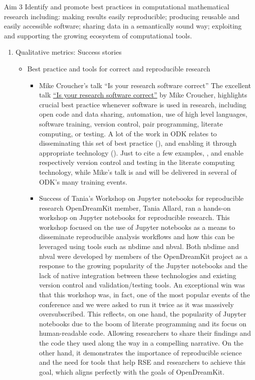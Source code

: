 \begin{recommendation}{Aim 3}
  Identify and promote best practices in computational mathematical research including: making results easily reproducible; producing
  reusable and easily accessible software; sharing data in a semantically sound way; exploiting and supporting the growing
  ecosystem of computational tools.
\end{recommendation}

\begin{enumerate}
\item Qualitative metrics: Success stories
\begin{itemize}
\item Best practice and tools for correct and reproducible research
 \begin{itemize}       
\item Mike Croucher's talk ``Is your research software correct''
 The excellent talk \href{https://mikecroucher.github.io/MLPM_talk/}{``Is your research software correct''} by Mike 
 Croucher, highlights crucial best practice whenever software is used in research, including open code and data sharing, 
 automation, use of high level languages, software training, version control, pair programming, literate computing, or testing. A 
 lot of the work in ODK relates to disseminating this set of best practice (), and enabling it through appropriate 
 technology ().  Just to cite a few examples, , and  
 enable respectively version control and testing in the \Jupyter literate computing technology, while Mike's talk is and will be 
 delivered in several of ODK's many training events.
         
  \item Success of Tania's Workshop on Jupyter notebooks for reproducible research
  OpenDreamKit member, Tania Allard, ran a hands-on workshop on Jupyter notebooks for reproducible research. This workshop focused on 
  the use of Jupyter notebooks as a means to disseminate reproducible analysis workflows and how this can be leveraged using tools 
  such as nbdime and nbval. Both nbdime and nbval were developed by members of the OpenDreamKit project as a response to the growing 
  popularity of the Jupyter notebooks and the lack of native integration between these technologies and existing version control and 
  validation/testing tools.
  An exceptional win was that this workshop was, in fact, one of the most popular events of the conference and we were asked to run 
  it twice as it was massively oversubscribed. This reflects, on one hand, the popularity of Jupyter notebooks due to the boom of 
  literate programming and its focus on human-readable code. Allowing researchers to share their findings and the code they used 
  along the way in a compelling narrative. On the other hand, it demonstrates the importance of reproducible science and the need for 
  tools that help RSE and researchers to achieve this goal, which aligns perfectly with the goals of OpenDreamKit.


\end{itemize}
\end{itemize}
\end{enumerate}

